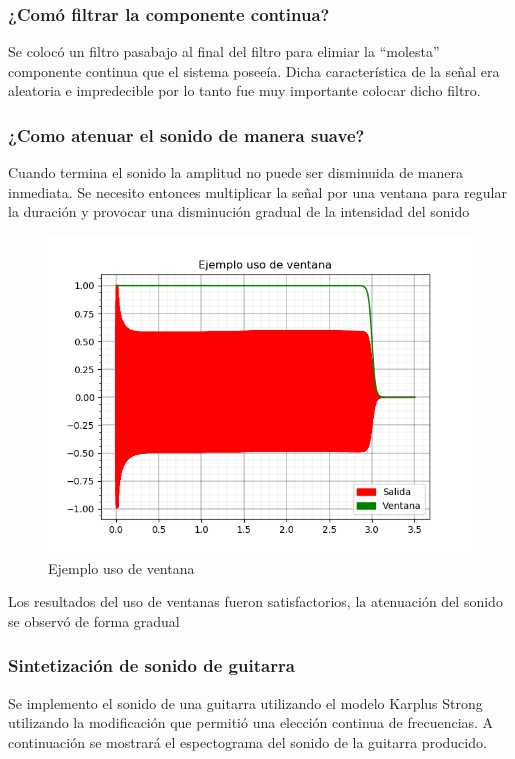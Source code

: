 \documentclass[assd_tp2_main.tex]{subfiles}
\begin{document}
\subsubsection{¿Comó filtrar la componente continua?}
Se colocó un filtro pasabajo al final del filtro para elimiar la ``molesta'' componente continua que el sistema poseeía. Dicha característica de la señal era aleatoria e impredecible por lo tanto fue muy importante colocar dicho filtro.

\subsubsection{¿Como atenuar el sonido de manera suave?}
Cuando termina el sonido la amplitud no puede ser disminuida de manera inmediata. Se necesito entonces multiplicar la señal por una ventana para regular la duración y provocar una disminución gradual de la intensidad del sonido

\begin{figure}[H]
	\begin{center}
	\includegraphics[scale=0.5]{graficos/ejemplo_uso_ventana.png}
	\caption{Ejemplo uso de ventana}

	\end{center}
\end{figure}
Los resultados del uso de ventanas fueron satisfactorios, la atenuación del sonido se observó de forma gradual

\subsubsection{Sintetización de sonido de guitarra}
Se implemento el sonido de una guitarra utilizando el modelo Karplus Strong utilizando la modificación que permitió una elección continua de frecuencias. A continuación se mostrará el espectograma del sonido de la guitarra producido.
\end{document}
